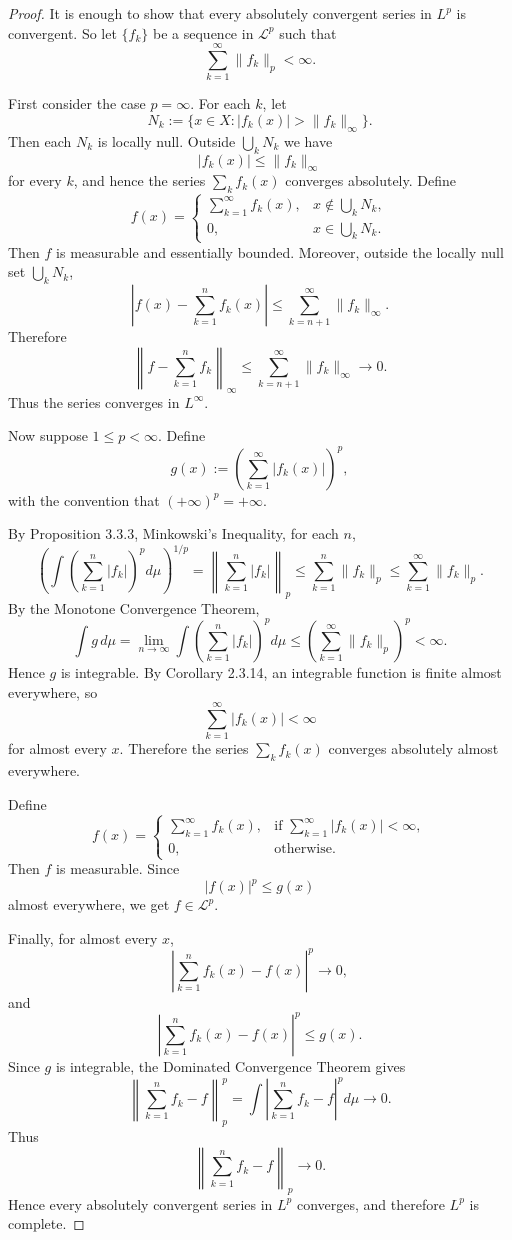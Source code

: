 \documentclass[12pt]{article}
\begin{document}
\begin{proof}
It is enough to show that every absolutely convergent series in $L^p$ is
convergent. So let $\{f_k\}$ be a sequence in $\mathcal{L}^p$ such that
\[
\sum_{k=1}^\infty \|f_k\|_p < \infty.
\]

First consider the case $p=\infty$. For each $k$, let
\[
N_k:=\{x\in X: |f_k(x)|>\|f_k\|_\infty\}.
\]
Then each $N_k$ is locally null. Outside $\bigcup_k N_k$ we have
\[
|f_k(x)|\le \|f_k\|_\infty
\]
for every $k$, and hence the series $\sum_k f_k(x)$ converges absolutely. Define
\[
f(x)=
\begin{cases}
\sum_{k=1}^\infty f_k(x), & x\notin \bigcup_k N_k,\\
0, & x\in \bigcup_k N_k.
\end{cases}
\]
Then $f$ is measurable and essentially bounded. Moreover, outside the locally
null set $\bigcup_k N_k$,
\[
\left|f(x)-\sum_{k=1}^n f_k(x)\right|
\le
\sum_{k=n+1}^\infty \|f_k\|_\infty.
\]
Therefore
\[
\left\|f-\sum_{k=1}^n f_k\right\|_\infty
\le
\sum_{k=n+1}^\infty \|f_k\|_\infty
\to 0.
\]
Thus the series converges in $L^\infty$.

Now suppose $1\le p<\infty$. Define
\[
g(x):=\left(\sum_{k=1}^\infty |f_k(x)|\right)^p,
\]
with the convention that $(+\infty)^p=+\infty$.

By Proposition 3.3.3, Minkowski's Inequality, for each $n$,
\[
\left(\int \left(\sum_{k=1}^n |f_k|\right)^p d\mu\right)^{1/p}
=
\left\|\sum_{k=1}^n |f_k|\right\|_p
\le
\sum_{k=1}^n \|f_k\|_p
\le
\sum_{k=1}^\infty \|f_k\|_p.
\]
By the Monotone Convergence Theorem,
\[
\int g\,d\mu
=
\lim_{n\to\infty}
\int \left(\sum_{k=1}^n |f_k|\right)^p d\mu
\le
\left(\sum_{k=1}^\infty \|f_k\|_p\right)^p
<\infty.
\]
Hence $g$ is integrable. By Corollary 2.3.14, an integrable function is finite
almost everywhere, so
\[
\sum_{k=1}^\infty |f_k(x)|<\infty
\]
for almost every $x$. Therefore the series $\sum_k f_k(x)$ converges absolutely
almost everywhere.

Define
\[
f(x)=
\begin{cases}
\sum_{k=1}^\infty f_k(x), & \text{if } \sum_{k=1}^\infty |f_k(x)|<\infty,\\
0, & \text{otherwise}.
\end{cases}
\]
Then $f$ is measurable. Since
\[
|f(x)|^p\le g(x)
\]
almost everywhere, we get $f\in \mathcal{L}^p$.

Finally, for almost every $x$,
\[
\left|\sum_{k=1}^n f_k(x)-f(x)\right|^p
\to 0,
\]
and
\[
\left|\sum_{k=1}^n f_k(x)-f(x)\right|^p
\le g(x).
\]
Since $g$ is integrable, the Dominated Convergence Theorem gives
\[
\left\|\sum_{k=1}^n f_k-f\right\|_p^p
=
\int \left|\sum_{k=1}^n f_k-f\right|^p d\mu
\to 0.
\]
Thus
\[
\left\|\sum_{k=1}^n f_k-f\right\|_p\to 0.
\]
Hence every absolutely convergent series in $L^p$ converges, and therefore
$L^p$ is complete.
\end{proof}
\end{document}
